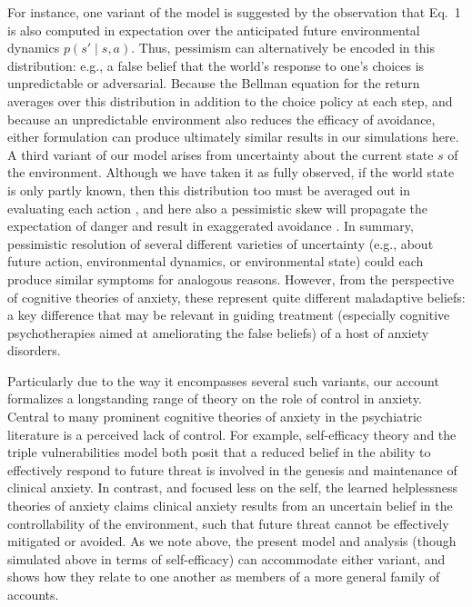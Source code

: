 \documentclass[manuscript]{stjour}
\begin{document}
For instance, one variant of the model is suggested by the observation that Eq.~1 is also computed in expectation over the anticipated future environmental dynamics $p(s' \mid s,a)$. Thus, pessimism can alternatively be encoded in this distribution: e.g., a false belief that the world's response to one's choices is unpredictable or adversarial. Because the Bellman equation for the return averages over this distribution in addition to the choice policy at each step, and because an unpredictable environment also reduces the efficacy of avoidance, either formulation can produce ultimately similar results in our simulations here. A third variant of our model arises from uncertainty about the current state $s$ of the environment. Although we have taken it as fully observed, if the world state is only partly known, then this distribution too must be averaged out in evaluating each action \citep{kaelbling1998}, and here also a pessimistic skew will propagate the expectation of danger and result in exaggerated avoidance \citep{Paulus2012}. In summary, pessimistic resolution of several different varieties of uncertainty (e.g., about future action, environmental dynamics, or environmental state) could each produce similar symptoms for analogous reasons. However, from the perspective of cognitive theories of anxiety, these represent quite different maladaptive beliefs: a key difference that may be relevant in guiding treatment (especially cognitive psychotherapies aimed at ameliorating the false beliefs) of a host of anxiety disorders.

Particularly due to the way it encompasses several such variants, our account formalizes a longstanding range of theory on the role of control in anxiety. Central to many prominent cognitive theories of anxiety in the psychiatric literature is a perceived lack of control. For example, self-efficacy theory \citep{bandura1977} and the triple vulnerabilities model \citep{barlow2002} both posit that a reduced belief in the ability to effectively respond to future threat is involved in the genesis and maintenance of clinical anxiety. In contrast, and focused less on the self, the learned helplessness theories of anxiety \citep{alloy1990} claims clinical anxiety results from an uncertain belief in the controllability of the environment, such that future threat cannot be effectively mitigated or avoided. As we note above, the present model and analysis (though simulated above in terms of self-efficacy) can accommodate either variant, and shows how they relate to one another as members of a more general family of accounts. 
\end{document}
